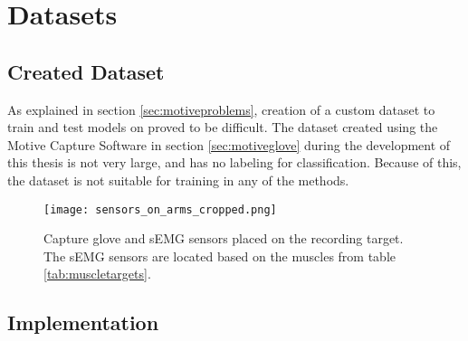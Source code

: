 \documentclass[../main.tex]{subfiles}
\begin{document}




\section{Datasets}
\subsection{Created Dataset}

As explained in section \ref{sec:motiveproblems}, creation of a custom dataset to train and test models on proved to be difficult.
The dataset created using the Motive Capture Software in section \ref{sec:motiveglove} during the development of this thesis is not very large, and has no labeling for classification.
Because of this, the dataset is not suitable for training in any of the methods.

\begin{figure}[H]
\begin{center}
\texttt{[image: sensors\_on\_arms\_cropped.png]}
\caption{Capture glove and sEMG sensors placed on the recording target. The sEMG sensors are located based on the muscles from table \ref{tab:muscletargets}.}
\label{fig:musclesensors}
\end{center}
\end{figure}

\subsection{Implementation}
\end{document}
